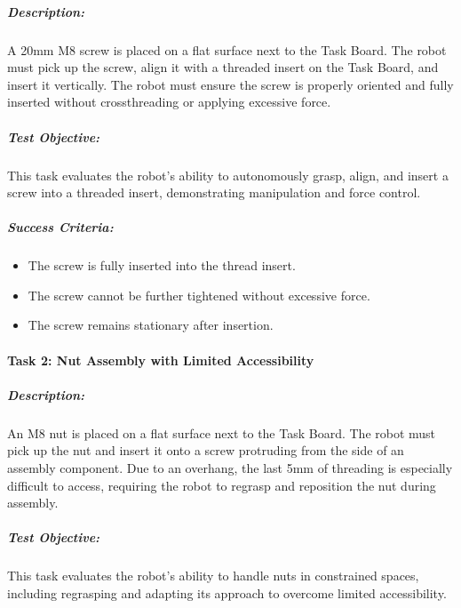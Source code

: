 \documentclass[letterpaper,10pt,english]{sphinxmanual}
\begin{document}
\subparagraph{Description:}
\label{\detokenize{robotic_instructions_screws_and_nuts:description}}
\sphinxAtStartPar
A 20mm M8 screw is placed on a flat surface next to the Task Board.
The robot must pick up the screw, align it with a threaded insert on the Task Board, and insert it vertically.
The robot must ensure the screw is properly oriented and fully inserted without cross\sphinxhyphen{}threading or applying excessive force.


\subparagraph{Test Objective:}
\label{\detokenize{robotic_instructions_screws_and_nuts:test-objective}}
\sphinxAtStartPar
This task evaluates the robot’s ability to autonomously grasp, align, and insert a screw into a threaded insert, demonstrating  manipulation
and force control.


\subparagraph{Success Criteria:}
\label{\detokenize{robotic_instructions_screws_and_nuts:success-criteria}}\begin{itemize}
\item {} 
\sphinxAtStartPar
The screw is fully inserted into the thread insert.

\item {} 
\sphinxAtStartPar
The screw cannot be further tightened without excessive force.

\item {} 
\sphinxAtStartPar
The screw remains stationary after insertion.

\end{itemize}


\paragraph{Task 2: Nut Assembly with Limited Accessibility}
\label{\detokenize{robotic_instructions_screws_and_nuts:task-2-nut-assembly-with-limited-accessibility}}

\subparagraph{Description:}
\label{\detokenize{robotic_instructions_screws_and_nuts:id1}}
\sphinxAtStartPar
An M8 nut is placed on a flat surface next to the Task Board.
The robot must pick up the nut and insert it onto a screw protruding from the side of an assembly component.
Due to an overhang, the last 5mm of threading is especially difficult to access, requiring the robot to regrasp and reposition the nut during assembly.


\subparagraph{Test Objective:}
\label{\detokenize{robotic_instructions_screws_and_nuts:id2}}
\sphinxAtStartPar
This task evaluates the robot’s ability to handle nuts in constrained spaces, including regrasping and adapting its approach to overcome limited accessibility.
\end{document}
